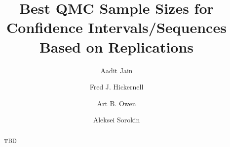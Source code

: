 \documentclass{amsart}
\begin{document}
\title{Best QMC Sample Sizes for Confidence Intervals/Sequences Based on Replications}

\author{Aadit Jain}

\author{Fred J. Hickernell }
\address{Department of Applied Mathematics, Illinois Institute of Technology, Chicago, IL}

\author{Art B. Owen}

\author{Aleksei Sorokin}

\begin{abstract} TBD
\end{abstract}

\maketitle
\end{document}
